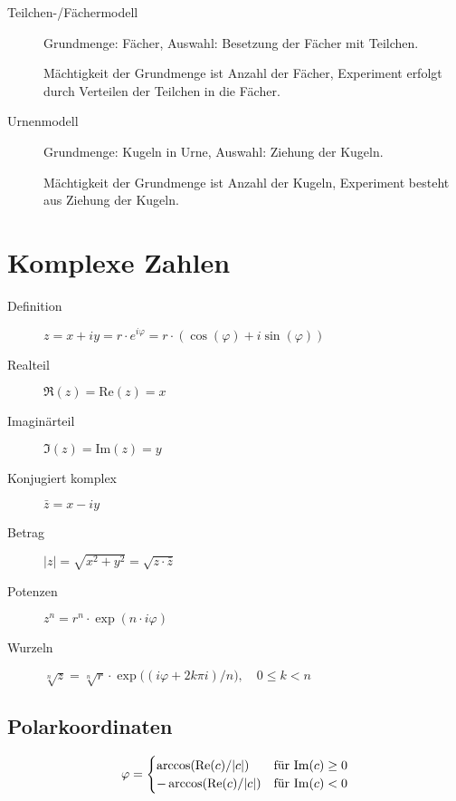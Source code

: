 \begin{description}
  \item [Teilchen-/Fächermodell] 
	Grundmenge: Fächer, Auswahl: Besetzung der Fäch\-er mit Teilchen.

	Mächtigkeit der Grundmenge ist Anzahl der Fächer, Experiment erfolgt durch Verteilen der Teilchen in die Fächer.

  \item [Urnenmodell] 
	Grundmenge: Kugeln in Urne, Auswahl: Ziehung der Kugeln.

	Mächtigkeit der Grundmenge ist Anzahl der Kugeln, Experiment besteht aus Ziehung der Kugeln.
\end{description}



\chapter{Komplexe Zahlen}
\begin{description}
  \item [Definition] 
	$z = x+iy = r\cdot e^{i\varphi} = r\cdot (\cos(\varphi)+i\sin(\varphi))$
  \item [Realteil] $\Re(z) = \mathrm{Re}(z) = x$
  \item [Imaginärteil] $\Im(z) = \mathrm{Im}(z) = y$
  \item [Konjugiert komplex] 
	$\bar{z} = x-iy$
  \item [Betrag] 
	$\lvert z \rvert = \sqrt{x^2+y^2} = \sqrt{z\cdot\bar{z}}$
  \item [Potenzen] 
	$z^n = r^n \cdot \exp(n\cdot i\varphi)$
  \item [Wurzeln] 
	$\sqrt[n]{z} = \sqrt[n]{r} \cdot \exp \bigl( (i\varphi+2k\pi i)/n\bigr), \quad 0 \leq k < n$
\end{description}

\section{Polarkoordinaten}

\[
  \varphi=\begin{cases}
     \arccos(\mathrm{Re}(c) / \lvert c \rvert) & \hbox{für $\mathrm{Im}(c) \geq 0$}\\
    -\arccos(\mathrm{Re}(c) / \lvert c \rvert) & \hbox{für $\mathrm{Im}(c) < 0$}
  \end{cases}
\]


